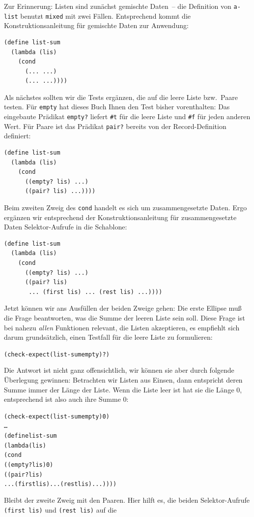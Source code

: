Zur Erinnerung: Listen sind zunächst gemischte Daten~-- die Definition
von \texttt{a-list} benutzt \texttt{mixed} mit zwei Fällen.  Entsprechend kommt die
Konstruktionsanleitung für gemischte Daten zur Anwendung:
%
\begin{verbatim}
(define list-sum
  (lambda (lis)
    (cond
      (... ...)
      (... ...))))
\end{verbatim}
%
Als nächstes sollten wir die Tests ergänzen, die auf die leere
Liste bzw.\ Paare testen.  Für \texttt{empty} hat dieses Buch Ihnen
den Test bisher vorenthalten: Das eingebaute Prädikat
\texttt{empty?} liefert \verb|#t| für
die leere Liste und \verb|#f| für jeden anderen Wert.  Für Paare ist
das Prädikat \texttt{pair?} bereits von der Record-Definition
definiert:
%
\begin{verbatim}
(define list-sum
  (lambda (lis)
    (cond
      ((empty? lis) ...)
      ((pair? lis) ...))))
\end{verbatim}
%
Beim zweiten Zweig des \texttt{cond} handelt es sich um
zusammengesetzte Daten. Ergo ergänzen wir entsprechend der
Konstruktionsanleitung für zusammengesetzte Daten Selektor-Aufrufe in
die Schablone:
%
\begin{verbatim}
(define list-sum
  (lambda (lis)
    (cond
      ((empty? lis) ...)
      ((pair? lis)
       ... (first lis) ... (rest lis) ...))))
\end{verbatim}
%
Jetzt können wir ans Ausfüllen der beiden Zweige gehen: Die erste
Ellipse muß die Frage beantworten, was die Summe der leeren Liste sein
soll.  Diese Frage ist bei nahezu \emph{allen} Funktionen relevant,
die Listen akzeptieren, es empfiehlt sich darum grundsätzlich, einen
Testfall für die leere Liste zu formulieren:
%
\begin{alltt}
(check-expect (list-sum empty) \textrm{?})
\end{alltt}
%
Die Antwort ist nicht ganz offensichtlich, wir können 
sie aber durch folgende Überlegung gewinnen: Betrachten wir Listen aus
Einsen, dann entspricht deren Summe immer der Länge der Liste.  Wenn
die Liste leer ist hat sie die Länge $0$, entsprechend ist also auch
ihre Summe $0$:
%
\begin{alltt}
(check-expect (list-sum empty) 0)
\ldots
(define list-sum
  (lambda (lis)
    (cond
      ((empty? lis) 0)
      ((pair? lis)
       ... (first lis) ... (rest lis) ...))))
\end{alltt}
%
Bleibt der zweite Zweig mit den Paaren.  Hier hilft es, die beiden
Selektor-Aufrufe \texttt{(first lis)} und \texttt{(rest lis)} auf die
